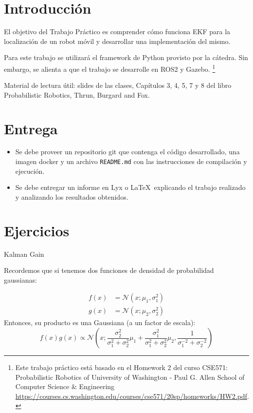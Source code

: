 \documentclass[tp]{lcc}
\begin{document}
	\maketitle
	
	
	\section{Introducción}
	
	El objetivo del Trabajo Práctico es comprender cómo funciona EKF para la localización de un robot móvil y desarrollar una implementación del mismo.
	
	Para este trabajo se utilizará el framework de Python provisto por la cátedra. Sin embargo, se alienta a que el trabajo se desarrolle en ROS2 y Gazebo. \footnote{Este trabajo práctico está basado en el Homework 2 del curso CSE571: Probabilistic Robotics of University of Washington - Paul G. Allen School of Computer Science \& Engineering \url{https://courses.cs.washington.edu/courses/cse571/20sp/homeworks/HW2.pdf}.}
	
	Material de lectura útil: slides de las clases, Capítulos 3, 4, 5, 7 y 8 del libro Probabilistic Robotics, Thrun, Burgard and Fox.
	
	
	\section{Entrega}
	\begin{itemize}
		\item Se debe proveer un repositorio git que contenga el código desarrollado, una imagen docker y un archivo \lstinline{README.md} con las instrucciones de compilación y ejecución.
		
		\item Se debe entregar un informe en Lyx o \LaTeX\  explicando el trabajo realizado y analizando los resultados obtenidos.
	\end{itemize}

	
	\section{Ejercicios}
    
    \ejercicio Kalman Gain
    
    Recordemos que si tenemos dos funciones de densidad de probabilidad gaussianas:
    
    \begin{align*}
        f(x) &= \mathcal{N}(x;\mu_{1},\sigma_{1}^{2})\\
        g(x) &= \mathcal{N}(x;\mu_{2},\sigma_{2}^{2})
    \end{align*}
%
    Entonces, su producto es una Gaussiana (a un factor de escala):
%
    \begin{equation*}
        f(x)g(x) \propto \mathcal{N} \left(x; \dfrac{\sigma_{2}^{2}}{\sigma_{1}^{2} + \sigma_{2}^{2}}\mu_{1} + \dfrac{\sigma_{1}^{2}}{\sigma_{1}^{2} + \sigma_{2}^{2}}\mu_{2}, \dfrac{1}{\sigma_{1}^{-2} + \sigma_{2}^{-2}} \right)
    \end{equation*}
\end{document}
